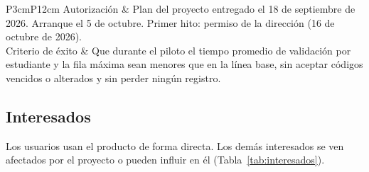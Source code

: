 \begin{table}[tbp]
\begin{tabular}{P{3cm}P{12cm}}
		Autorización & Plan del proyecto entregado el 18 de septiembre de 2026. Arranque el 5 de octubre. Primer hito: permiso de la dirección (16 de octubre de 2026). \\
		Criterio de éxito & Que durante el piloto el tiempo promedio de validación por estudiante y la fila máxima sean menores que en la línea base, sin aceptar códigos vencidos o alterados y sin perder ningún registro. \\
		\bottomrule
	\end{tabular}
\end{table}

\subsection{Interesados}
Los usuarios usan el producto de forma directa. Los demás interesados se ven
afectados por el proyecto o pueden influir en él (Tabla~\ref{tab:interesados}).

